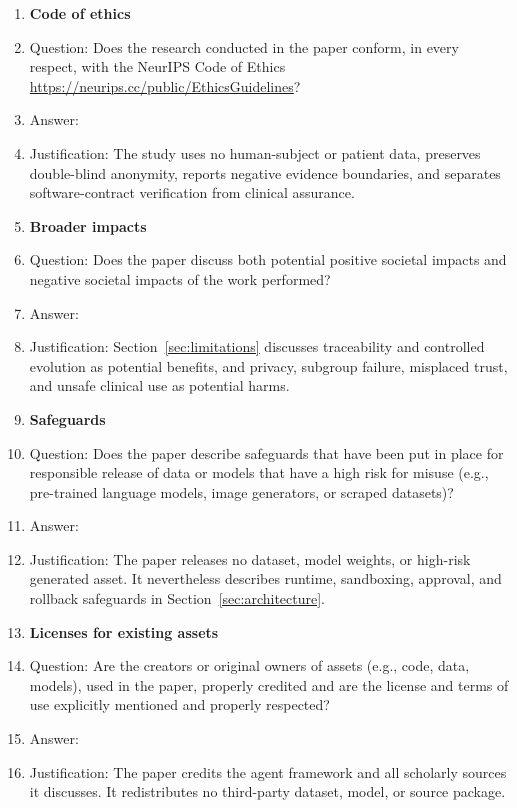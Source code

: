 \begin{enumerate}
\item {\bf Code of ethics}
    \item[] Question: Does the research conducted in the paper conform, in every respect, with the NeurIPS Code of Ethics \url{https://neurips.cc/public/EthicsGuidelines}?
    \item[] Answer: \answerYes{}
    \item[] Justification: The study uses no human-subject or patient data,
    preserves double-blind anonymity, reports negative evidence boundaries,
    and separates software-contract verification from clinical assurance.

\item {\bf Broader impacts}
    \item[] Question: Does the paper discuss both potential positive societal impacts and negative societal impacts of the work performed?
    \item[] Answer: \answerYes{}
    \item[] Justification: Section~\ref{sec:limitations} discusses traceability
    and controlled evolution as potential benefits, and privacy, subgroup
    failure, misplaced trust, and unsafe clinical use as potential harms.

\item {\bf Safeguards}
    \item[] Question: Does the paper describe safeguards that have been put in place for responsible release of data or models that have a high risk for misuse (e.g., pre-trained language models, image generators, or scraped datasets)?
    \item[] Answer: \answerNA{}
    \item[] Justification: The paper releases no dataset, model weights, or
    high-risk generated asset.  It nevertheless describes runtime,
    sandboxing, approval, and rollback safeguards in
    Section~\ref{sec:architecture}.

\item {\bf Licenses for existing assets}
    \item[] Question: Are the creators or original owners of assets (e.g., code, data, models), used in the paper, properly credited and are the license and terms of use explicitly mentioned and properly respected?
    \item[] Answer: \answerYes{}
    \item[] Justification: The paper credits the agent framework and all
    scholarly sources it discusses.  It redistributes no third-party dataset,
    model, or source package.


\end{enumerate}
